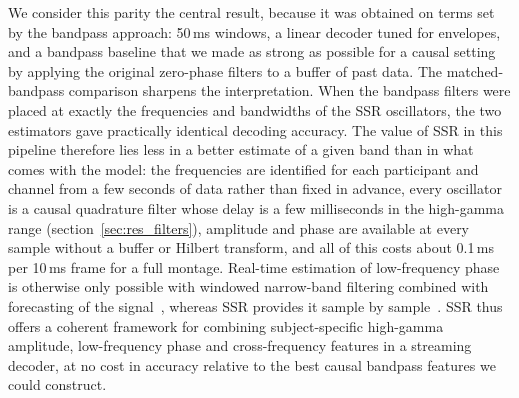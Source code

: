 \documentclass{iopjournal}
\begin{document}
We consider this parity the central result, because it was obtained on terms set by the bandpass approach: 50\,ms windows, a linear decoder tuned for envelopes, and a bandpass baseline that we made as strong as possible for a causal setting by applying the original zero-phase filters to a buffer of past data. The matched-bandpass comparison sharpens the interpretation. When the bandpass filters were placed at exactly the frequencies and bandwidths of the SSR oscillators, the two estimators gave practically identical decoding accuracy. The value of SSR in this pipeline therefore lies less in a better estimate of a given band than in what comes with the model: the frequencies are identified for each participant and channel from a few seconds of data rather than fixed in advance, every oscillator is a causal quadrature filter whose delay is a few milliseconds in the high-gamma range (section~\ref{sec:res_filters}), amplitude and phase are available at every sample without a buffer or Hilbert transform, and all of this costs about 0.1\,ms per 10\,ms frame for a full montage. Real-time estimation of low-frequency phase is otherwise only possible with windowed narrow-band filtering combined with forecasting of the signal~\cite{Zrenner2020,McIntosh2020}, whereas SSR provides it sample by sample~\cite{Wodeyar2021}. SSR thus offers a coherent framework for combining subject-specific high-gamma amplitude, low-frequency phase and cross-frequency features in a streaming decoder, at no cost in accuracy relative to the best causal bandpass features we could construct.
\end{document}
